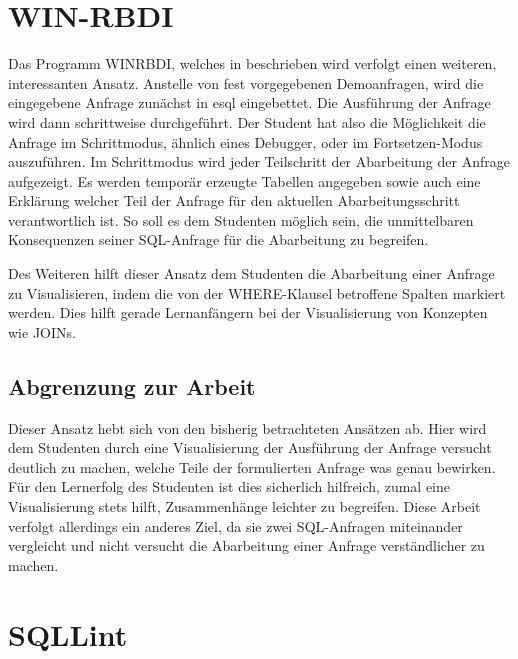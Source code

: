 \section{WIN-RBDI}

Das Programm WINRBDI, welches in \cite{winrbdi1} beschrieben wird verfolgt einen weiteren, interessanten Ansatz. Anstelle von fest vorgegebenen Demoanfragen, wird die eingegebene Anfrage zunächst in esql eingebettet. Die Ausführung der Anfrage wird dann schrittweise durchgeführt. Der Student hat also die Möglichkeit die Anfrage im Schrittmodus, ähnlich eines Debugger, oder im Fortsetzen-Modus auszuführen. Im Schrittmodus wird jeder Teilschritt der Abarbeitung der Anfrage aufgezeigt. Es werden temporär erzeugte Tabellen angegeben sowie auch eine Erklärung welcher Teil der Anfrage für den aktuellen Abarbeitungsschritt verantwortlich ist. So soll es dem Studenten möglich sein, die unmittelbaren Konsequenzen seiner SQL-Anfrage für die Abarbeitung zu begreifen. 

Des Weiteren hilft dieser Ansatz dem Studenten die Abarbeitung einer Anfrage zu Visualisieren, indem die von der WHERE-Klausel betroffene Spalten markiert werden. Dies hilft gerade Lernanfängern bei der Visualisierung von Konzepten wie JOINs.

\subsection*{Abgrenzung zur Arbeit}

Dieser Ansatz hebt sich von den bisherig betrachteten Ansätzen ab. Hier wird dem Studenten durch eine Visualisierung der Ausführung der Anfrage versucht deutlich zu machen, welche Teile der formulierten Anfrage was genau bewirken. Für den Lernerfolg des Studenten ist dies sicherlich hilfreich, zumal eine Visualisierung stets hilft, Zusammenhänge leichter zu begreifen. Diese Arbeit verfolgt allerdings ein anderes Ziel, da sie zwei SQL-Anfragen miteinander vergleicht und nicht versucht die Abarbeitung einer Anfrage verständlicher zu machen.

\section{SQLLint}

